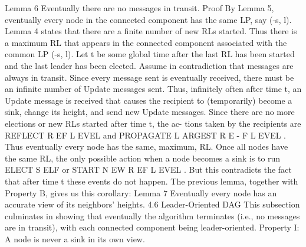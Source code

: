 Lemma 6 Eventually there are no messages in transit. Proof By Lemma 5, eventually every node in the connected component has the same LP, say (-s, l). Lemma 4 states that there are a finite number of new RLs started. Thus there is a maximum RL that appears in the connected component associated with the common LP (-s, l). Let t be some global time after the last RL has been started and the last leader has been elected. Assume in contradiction that messages are always in transit. Since every message sent is eventually received, there must be an infinite number of Update messages sent. Thus, infinitely often after time t, an Update message is received that causes the recipient to (temporarily) become a sink, change its height, and send new Update messages. Since there are no more elections or new RLs started after time t, the ac- tions taken by the recipients are REFLECT R EF L EVEL and PROPAGATE L ARGEST R E - F L EVEL . Thus eventually every node has the same, maximum, RL. Once all nodes have the same RL, the only possible action when a node becomes a sink is to run ELECT S ELF or START N EW R EF L EVEL . But this contradicts the fact that after time t these events do not happen. The previous lemma, together with Property B, gives us this corollary: Lemma 7 Eventually every node has an accurate view of its neighbors’ heights. 4.6 Leader-Oriented DAG This subsection culminates in showing that eventually the algorithm terminates (i.e., no messages are in transit), with each connected component being leader-oriented. Property I: A node is never a sink in its own view.
